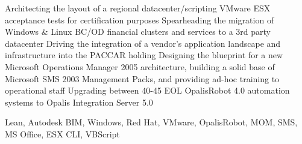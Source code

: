 \begin{experiences}
{\begin{itemize}
                        \linebreak Architecting the layout of a regional datacenter/scripting VMware ESX acceptance tests for certification purposes
                        \linebreak Spearheading the migration of Windows \& Linux BC/OD financial clusters and services to a 3rd party datacenter
                        \linebreak Driving the integration of a vendor's application landscape and infrastructure into the PACCAR holding
                        \linebreak Designing the blueprint for a new Microsoft Operations Manager 2005 architecture, building a solid base of Microsoft SMS 2003 Management Packs, and providing ad-hoc training to operational staff
                        \linebreak Upgrading between 40-45 EOL OpalisRobot 4.0 automation systems to Opalis Integration Server 5.0
                      \end{itemize}
                    }
                    {Lean, Autodesk BIM, Windows, Red Hat, VMware, OpalisRobot, MOM, SMS, MS Office, ESX CLI, VBScript}
\end{experiences}
